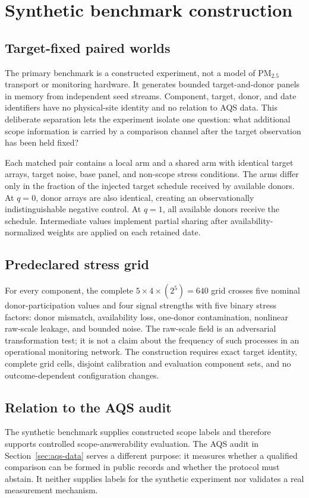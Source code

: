 \section{Synthetic benchmark construction}
\suppressfloats[t]
\label{sec:synthetic-benchmark}

\subsection{Target-fixed paired worlds}

The primary benchmark is a constructed experiment, not a model of PM$_{2.5}$
transport or monitoring hardware. It generates bounded target-and-donor panels
in memory from independent seed streams. Component, target, donor, and date
identifiers have no physical-site identity and no relation to AQS data. This
deliberate separation lets the experiment isolate one question: what additional
scope information is carried by a comparison channel after the target
observation has been held fixed?

Each matched pair contains a local arm and a shared arm with identical target
arrays, target noise, base panel, and non-scope stress conditions. The arms
differ only in the fraction of the injected target schedule received by
available donors. At $q=0$, donor arrays are also identical, creating an
observationally indistinguishable negative control. At $q=1$, all available
donors receive the schedule. Intermediate values implement partial sharing
after availability-normalized weights are applied on each retained date.

\subsection{Predeclared stress grid}

For every component, the complete $5\times4\times(2^5)=640$ grid crosses five
nominal donor-participation values and four signal strengths with five binary
stress factors: donor mismatch, availability loss, one-donor contamination,
nonlinear raw-scale leakage, and bounded noise. The raw-scale field is an
adversarial transformation test; it is not a claim about the frequency of such
processes in an operational monitoring network. The construction requires exact
target identity, complete grid cells, disjoint calibration and evaluation
component sets, and no outcome-dependent configuration changes.

\subsection{Relation to the AQS audit}

The synthetic benchmark supplies constructed scope labels and therefore
supports controlled scope-answerability evaluation. The AQS audit in
Section~\ref{sec:aqs-data} serves a different purpose: it measures whether a
qualified comparison can be formed in public records and whether the protocol
must abstain. It neither supplies labels for the synthetic experiment nor
validates a real measurement mechanism.
